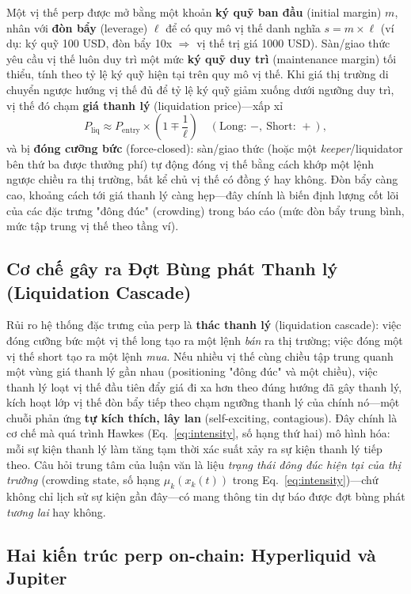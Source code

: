 \documentclass[11pt,a4paper]{article}
\begin{document}
Một vị thế perp được mở bằng một khoản \textbf{ký quỹ ban đầu} (initial margin) $m$, nhân với \textbf{đòn bẩy} (leverage) $\ell$ để có quy mô vị thế danh nghĩa $s = m \times \ell$ (ví dụ: ký quỹ 100 USD, đòn bẩy 10x $\Rightarrow$ vị thế trị giá 1000 USD). Sàn/giao thức yêu cầu vị thế luôn duy trì một mức \textbf{ký quỹ duy trì} (maintenance margin) tối thiểu, tính theo tỷ lệ ký quỹ hiện tại trên quy mô vị thế. Khi giá thị trường di chuyển ngược hướng vị thế đủ để tỷ lệ ký quỹ giảm xuống dưới ngưỡng duy trì, vị thế đó chạm \textbf{giá thanh lý} (liquidation price)---xấp xỉ
\[
  P_{\text{liq}} \approx P_{\text{entry}} \times \left(1 \mp \frac{1}{\ell}\right) \quad (\text{Long: } -,\ \text{Short: } +),
\]
và bị \textbf{đóng cưỡng bức} (force-closed): sàn/giao thức (hoặc một \emph{keeper}/liquidator bên thứ ba được thưởng phí) tự động đóng vị thế bằng cách khớp một lệnh ngược chiều ra thị trường, bất kể chủ vị thế có đồng ý hay không. Đòn bẩy càng cao, khoảng cách tới giá thanh lý càng hẹp---đây chính là biến định lượng cốt lõi của các đặc trưng "đông đúc" (crowding) trong báo cáo (mức đòn bẩy trung bình, mức tập trung vị thế theo tầng ví).

\subsection{Cơ chế gây ra Đợt Bùng phát Thanh lý (Liquidation Cascade)}

Rủi ro hệ thống đặc trưng của perp là \textbf{thác thanh lý} (liquidation cascade): việc đóng cưỡng bức một vị thế long tạo ra một lệnh \emph{bán} ra thị trường; việc đóng một vị thế short tạo ra một lệnh \emph{mua}. Nếu nhiều vị thế cùng chiều tập trung quanh một vùng giá thanh lý gần nhau (positioning "đông đúc" và một chiều), việc thanh lý loạt vị thế đầu tiên đẩy giá đi xa hơn theo đúng hướng đã gây thanh lý, kích hoạt lớp vị thế đòn bẩy tiếp theo chạm ngưỡng thanh lý của chính nó---một chuỗi phản ứng \textbf{tự kích thích, lây lan} (self-exciting, contagious). Đây chính là cơ chế mà quá trình Hawkes (Eq.~\eqref{eq:intensity}, số hạng thứ hai) mô hình hóa: mỗi sự kiện thanh lý làm tăng tạm thời xác suất xảy ra sự kiện thanh lý tiếp theo. Câu hỏi trung tâm của luận văn là liệu \emph{trạng thái đông đúc hiện tại của thị trường} (crowding state, số hạng $\mu_k(x_k(t))$ trong Eq.~\eqref{eq:intensity})---chứ không chỉ lịch sử sự kiện gần đây---có mang thông tin dự báo được đợt bùng phát \emph{tương lai} hay không.

\subsection{Hai kiến trúc perp on-chain: Hyperliquid và Jupiter}
\end{document}
